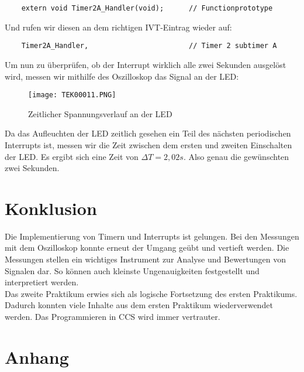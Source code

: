 \documentclass{article}
\begin{document}
\begin{verbatim}
    extern void Timer2A_Handler(void);      // Functionprototype
\end{verbatim}

Und rufen wir diesen an dem richtigen IVT-Eintrag wieder auf: 

\begin{verbatim}
    Timer2A_Handler,                        // Timer 2 subtimer A
\end{verbatim}

\newpage

Um nun zu überprüfen, ob der Interrupt wirklich alle zwei Sekunden ausgelöst wird, messen wir mithilfe des Oszilloskop das Signal an der LED:

\begin{figure}[h]
    \centering
    \texttt{[image: TEK00011.PNG]}
    \caption{Zeitlicher Spannungsverlauf an der LED}
\end{figure}

Da das Aufleuchten der LED zeitlich gesehen ein Teil des nächsten periodischen Interrupts ist, messen wir die Zeit zwischen dem ersten und zweiten Einschalten der LED. Es ergibt sich eine Zeit von $\Delta T = 2,02s$. Also genau die gewünschten zwei Sekunden.

\section{Konklusion}

Die Implementierung von Timern und Interrupts ist gelungen. Bei den Messungen mit dem Oszilloskop konnte erneut der Umgang geübt und vertieft werden. Die Messungen stellen ein wichtiges Instrument zur Analyse und Bewertungen von Signalen dar. So können auch kleinste Ungenauigkeiten festgestellt und interpretiert werden.\\
Das zweite Praktikum erwies sich als logische Fortsetzung des ersten Praktikums. Dadurch konnten viele Inhalte aus dem ersten Praktikum wiederverwendet werden. Das Programmieren in CCS wird immer vertrauter.

\newpage

\appendix

\section{Anhang}
\end{document}
